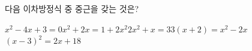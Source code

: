 다음 이차방정식 중 중근을 갖는 것은?
\begin{choicesii}{$x^2-4x+3=0$}{$x^2+2x=1+2x^2$}{$2x^2+x=3$}{$3(x+2)=x^2-2x$}{$(x-3)^2=2x+18$}\end{choicesii}
